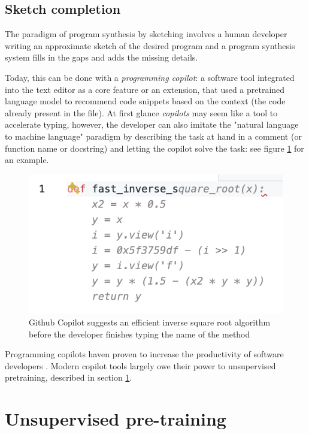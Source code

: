 \subsection{Sketch completion}
\label{sec:sketching}

The paradigm of program synthesis by sketching \cite{solar-lezamaProgramSynthesisSketching2008} involves a human developer writing an approximate sketch of the desired program and a program synthesis system fills in the gaps and adds the missing details.

Today, this can be done with a \emph{programming copilot}: a software tool integrated into the text editor as a core feature or an extension, that used a pretrained language model to recommend code snippets based on the context (the code already present in the file).
At first glance \emph{copilots} may seem like a tool to accelerate typing, however, the developer can also imitate the "natural language to machine language" paradigm by describing the task at hand in a comment (or function name or docstring) and letting the copilot solve the task: see figure \ref{fig:fastinversesqrt} for an example.

\begin{figure}
    \centering
    \includegraphics[width=0.35\linewidth]{images/fastinversesqrt.png}
    \caption{Github Copilot \cite{dakhelGithubCopilotAi2023, nguyenEmpiricalEvaluationGitHub2022, wermelingerUsingGithubCopilot2023} suggests an efficient inverse square root algorithm  \cite{lomontFastInverseSquare2003} before the developer finishes typing the name of the method}
    \label{fig:fastinversesqrt}
\end{figure}

Programming copilots haven proven to increase the productivity of software developers \cite{liangLargeScaleSurveyUsability2024}.
Modern copilot tools largely owe their power to unsupervised pretraining, described in section \ref{sec:pretrain}.

\newpage
\section{Unsupervised pre-training}
\label{sec:pretrain}


